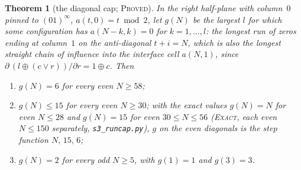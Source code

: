 \documentclass[11pt]{article}
\newtheorem{theorem}{Theorem}[section]
\theoremstyle{definition}
\theoremstyle{remark}
\newcommand{\PROVED}{\textsc{Proved}}
\newcommand{\EXACT}{\textsc{Exact}}
\begin{document}
\begin{theorem}[the diagonal cap; \PROVED]\label{du:thm:cap}
In the right half-plane with column~$0$ pinned to $(01)^{\infty}$, $a(t,0)=t\bmod2$, let $g(N)$ be the
largest $l$ for which some configuration has $a(N-k,k)=0$ for $k=1,\dots,l$: the longest run of zeros
ending at column~$1$ on the anti-diagonal $t+i=N$, which is also the longest straight chain of
influence into the interface cell $a(N,1)$, since $\partial\,(l\oplus(c\vee r))/\partial r=1\oplus c$.
Then
\begin{enumerate}[nosep]
\item[(i)] $g(N)=6$ for every even $N\ge58$;
\item[(ii)] $g(N)\le15$ for every even $N\ge30$; with the exact values $g(N)=N$ for even $N\le28$ and
$g(N)=15$ for even $30\le N\le56$ (\EXACT, each even $N\le150$ separately, \texttt{s3\_runcap.py}),
$g$ on the even diagonals is the step function $N,\,15,\,6$;
\item[(iii)] $g(N)=2$ for every odd $N\ge5$, with $g(1)=1$ and $g(3)=3$.
\end{enumerate}
\end{theorem}
\end{document}
